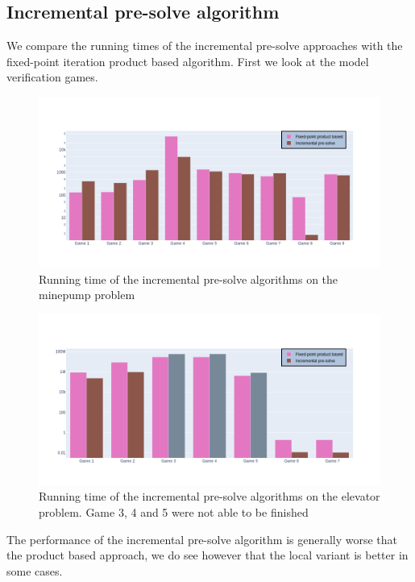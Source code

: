 \subsection{Incremental pre-solve algorithm}
We compare the running times of the incremental pre-solve approaches with the fixed-point iteration product based algorithm. First we look at the model verification games.
\begin{figure}[H]
	\includegraphics[width=1\linewidth]{"results/minepump/Fixed-point product based_Incremental pre-solve_"}
	\caption{Running time of the incremental pre-solve algorithms on the minepump problem}
	\label{fig:minepumpzlnks}
\end{figure}%
\begin{figure}[H]
	\includegraphics[width=1\linewidth]{"results/elevator/Fixed-point product based_Incremental pre-solve_"}
	\caption{Running time of the incremental pre-solve algorithms on the elevator problem. Game 3, 4 and 5 were not able to be finished }
	\label{fig:elevatorzlnks}
\end{figure}%
The performance of the incremental pre-solve algorithm is generally worse that the product based approach, we do see however that the local variant is better in some cases.

